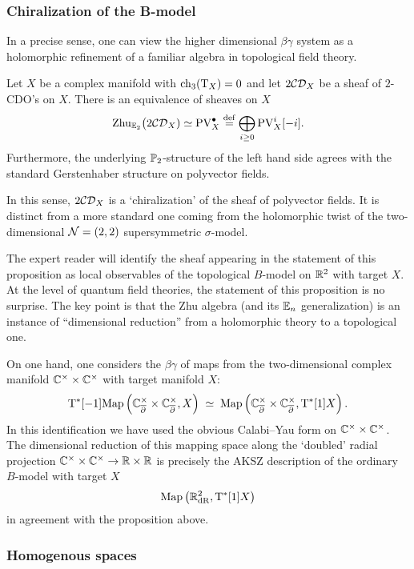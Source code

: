\documentclass[11pt]{amsart}
\def\CDO{{\cC\cD}}
\begin{document}
\subsubsection{Chiralization of the B-model}

In a precise sense, one can view the higher dimensional $\beta\gamma$ system as a holomorphic refinement of a familiar algebra in topological field theory.

\begin{prop}
Let $X$ be a complex manifold with ${\rm ch}_{3}({\rm T}_X) = 0$ and let $2\CDO_X$ be a sheaf of $2$-CDO's on $X$. 
There is an equivalence of sheaves on $X$
\[
{\rm Zhu}_{\EE_2} \big(2\CDO_X) \simeq {\rm PV}^{\bu}_X \define \bigoplus_{i\geq 0} {\rm PV}^i_X [-i] .
\]
Furthermore, the underlying $\mathbb P_2$-structure of the left hand side agrees with the standard Gerstenhaber structure on polyvector fields.
\end{prop}

\begin{rmk}
In this sense, $2\CDO_X$ is a `chiralization' of the sheaf of polyvector fields.
It is distinct from a more standard one coming from the holomorphic twist of the two-dimensional $\mathcal N=(2,2)$ supersymmetric $\sigma$-model.
\end{rmk}

The expert reader will identify the sheaf appearing in the statement of this proposition as local observables of the topological $B$-model on $\mathbb R^2$ with target $X$. 
At the level of quantum field theories, the statement of this proposition is no surprise. 
The key point is that the Zhu algebra (and its $\mathbb E_n$ generalization) is an instance of ``dimensional reduction'' from a holomorphic theory to a topological one. 

On one hand, one considers the $\beta\gamma$ of maps from the two-dimensional complex manifold $\mathbb C^\times \times \mathbb C^\times$ with target manifold $X$:
\[
{\rm T}^*[-1] {\rm Map}\left(\mathbb C_{\overline{\partial}}^\times \times \mathbb C_{\overline{\partial}}^\times , X\right) \; \simeq \; {\rm Map}\left(\mathbb C_{\overline{\partial}}^\times \times \mathbb C_{\overline{\partial}}^\times , {\rm T}^*[1] X\right) .
\]
In this identification we have used the obvious Calabi--Yau form on $\mathbb C^\times \times \mathbb C^\times$. 
The dimensional reduction of this mapping space along the `doubled' radial projection $\mathbb C^\times \times \mathbb C^\times \to \mathbb R \times \mathbb R$ is precisely the AKSZ description of the ordinary $B$-model with target $X$
\[
{\rm Map}\left(\mathbb R^2_{\rm dR} , {\rm T}^*[1] X\right)
\]
in agreement with the proposition above.


\subsubsection{Homogenous spaces}
\end{document}
